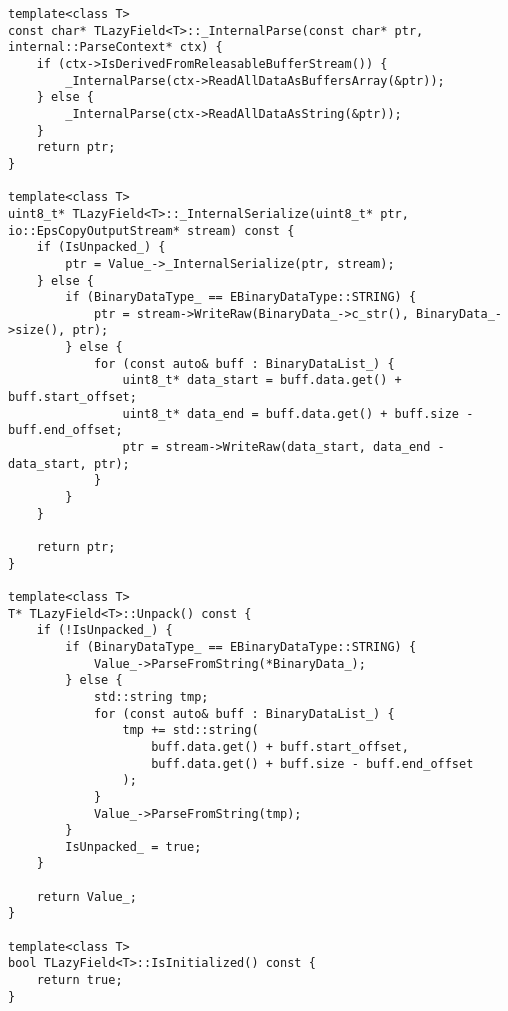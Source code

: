 \begin{lstlisting}[style=CodeListing]
template<class T>
const char* TLazyField<T>::_InternalParse(const char* ptr, internal::ParseContext* ctx) {
    if (ctx->IsDerivedFromReleasableBufferStream()) {
        _InternalParse(ctx->ReadAllDataAsBuffersArray(&ptr));
    } else {
        _InternalParse(ctx->ReadAllDataAsString(&ptr));
    }
    return ptr;
}

template<class T>
uint8_t* TLazyField<T>::_InternalSerialize(uint8_t* ptr, io::EpsCopyOutputStream* stream) const {
    if (IsUnpacked_) {
        ptr = Value_->_InternalSerialize(ptr, stream);
    } else {
        if (BinaryDataType_ == EBinaryDataType::STRING) {
            ptr = stream->WriteRaw(BinaryData_->c_str(), BinaryData_->size(), ptr);
        } else {
            for (const auto& buff : BinaryDataList_) {
                uint8_t* data_start = buff.data.get() + buff.start_offset;
                uint8_t* data_end = buff.data.get() + buff.size - buff.end_offset;                
                ptr = stream->WriteRaw(data_start, data_end - data_start, ptr);
            }
        }
    }

    return ptr;
}

template<class T>
T* TLazyField<T>::Unpack() const {
    if (!IsUnpacked_) {
        if (BinaryDataType_ == EBinaryDataType::STRING) {
            Value_->ParseFromString(*BinaryData_);
        } else {
            std::string tmp;
            for (const auto& buff : BinaryDataList_) {
                tmp += std::string(
                    buff.data.get() + buff.start_offset,
                    buff.data.get() + buff.size - buff.end_offset
                );
            }
            Value_->ParseFromString(tmp);
        }
        IsUnpacked_ = true;
    }

    return Value_;
}

template<class T>
bool TLazyField<T>::IsInitialized() const {
    return true;
}
\end{lstlisting}
\pagebreak
